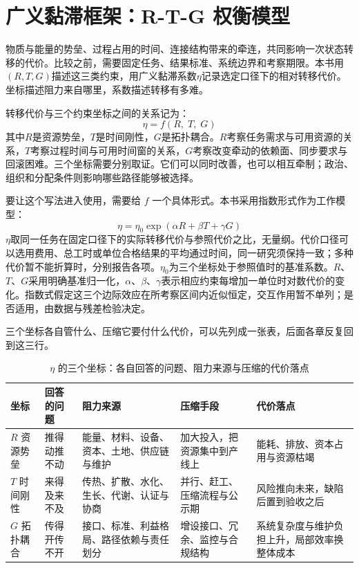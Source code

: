 \section{广义黏滞框架：R-T-G 权衡模型}

物质与能量的势垒、过程占用的时间、连接结构带来的牵连，共同影响一次状态转移的代价。比较之前，需要固定任务、结果标准、系统边界和考察期限。本书用$(R,T,G)$描述这三类约束，用广义黏滞系数$\eta$记录选定口径下的相对转移代价。坐标描述阻力来自哪里，系数描述转移有多难。


转移代价与三个约束坐标之间的关系记为：
\begin{equation}
\eta = f(R,\;T,\;G)
\label{eq:eta-rtg}
\end{equation}
其中$R$是资源势垒，$T$是时间刚性，$G$是拓扑耦合。$R$考察任务需求与可用资源的关系，$T$考察过程时间与可用时间窗的关系，$G$考察改变牵动的依赖面、同步要求与回滚困难。三个坐标需要分别取证。它们可以同时改善，也可以相互牵制；政治、组织和分配条件则影响哪些路径能够被选择。

要让这个写法进入使用，需要给 $f$ 一个具体形式。本书采用指数形式作为工作模型：
\begin{equation}
\eta = \eta_0 \exp(\alpha R + \beta T + \gamma G)
\label{eq:eta-exp}
\end{equation}
$\eta$取同一任务在固定口径下的实际转移代价与参照代价之比，无量纲。代价口径可以选用费用、总工时或单位合格结果的平均通过时间，同一研究须保持一致；多种代价暂不能折算时，分别报告各项。$\eta_0$为三个坐标处于参照值时的基准系数。$R$、$T$、$G$采用明确基准归一化，$\alpha$、$\beta$、$\gamma$表示相应约束每增加一单位时对数代价的变化。指数式假定这三个边际效应在所考察区间内近似恒定，交互作用暂不单列；是否适用，由数据与残差检验决定。

三个坐标各自管什么、压缩它要付什么代价，可以先列成一张表，后面各章反复回到这三行。

\begin{table}[ht]
\centering
\caption{$\eta$ 的三个坐标：各自回答的问题、阻力来源与压缩的代价落点}
\label{tab:ch2-rtg}
{\small
\begin{tabularx}{\textwidth}{@{}l >{\RaggedRight\arraybackslash}p{1.75cm} >{\RaggedRight\arraybackslash}p{3.35cm} >{\RaggedRight\arraybackslash}p{2.5cm} >{\RaggedRight\arraybackslash}X@{}}
\toprule
坐标 & 回答的问题 & 阻力来源 & 压缩手段 & 代价落点 \\
\midrule
$R$ 资源势垒 & 推得动推不动 & 能量、材料、设备、资本、土地、供应链与维护 & 加大投入，把资源集中到产线上 & 能耗、排放、资本占用与资源枯竭 \\
$T$ 时间刚性 & 来得及来不及 & 传热、扩散、水化、生长、代谢、认证与协商 & 并行、赶工、压缩流程与公示期 & 风险推向未来，缺陷后置到验收之后 \\
$G$ 拓扑耦合 & 传得开传不开 & 接口、标准、利益格局、路径依赖与责任划分 & 增设接口、冗余、监控与合规结构 & 系统复杂度与维护负担上升，局部效率换整体成本 \\
\bottomrule
\end{tabularx}}
\end{table}

